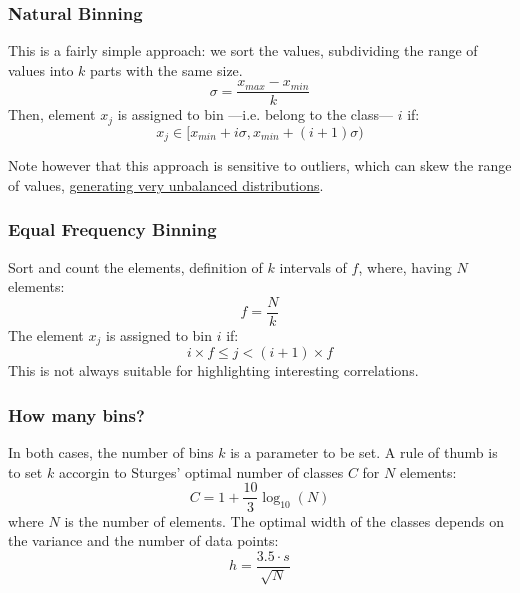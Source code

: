 
\subsubsection{Natural Binning}
This is a fairly simple approach:
we sort the values, subdividing the range of values into $k$ parts with the same size.
\[
\sigma = \frac{x_{max} - x_{min}}{k}
\]
Then, element $x_j$ is assigned to bin ---i.e. belong to the class--- $i$ if:
\[
x_j \in [x_{min} + i\sigma, x_{min} + (i+1)\sigma)
\]

Note however that this approach is sensitive to outliers, which can skew the range of values, \ul{generating very unbalanced distributions}.

\subsubsection{Equal Frequency Binning}
Sort and count the elements, definition of $k$ intervals of $f$, where, having $N$ elements:
\[f = \frac{N}{k}\]
The element $x_j$ is assigned to bin $i$ if:
\[i \times f \leq j < (i+1) \times f\]
This is not always suitable for highlighting interesting correlations.

\subsubsection{How many bins?}
In both cases, the number of bins $k$ is a parameter to be set.
A rule of thumb is to set $k$ accorgin to Sturges' optimal number of classes $C$ for $N$ elements:
\[C = 1 + \frac{10}{3} \log_{10}(N) \]
where $N$ is the number of elements.
The optimal width of the classes depends on the variance and the number of data points:
\[h = \frac{3.5\cdot s}{\sqrt{N}}\]

